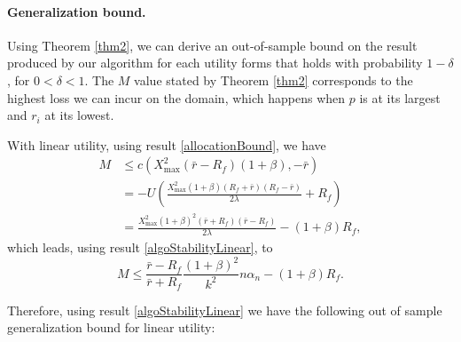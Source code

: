 \paragraph{Generalization bound.}
Using Theorem \ref{thm2}, we can derive an out-of-sample bound on the result produced by
our algorithm for each utility forms that holds with probability $1-\delta$, for
$0<\delta<1$. The $M$ value stated by Theorem \ref{thm2} corresponds to the highest loss
we can incur on the domain, which happens when $p$ is at its largest and $r_i$ at its
lowest.

With linear utility, using result \eqref{allocationBound}, we have
\begin{align*}
  M &\leq c(X^2_{\max}(\bar r - R_f)(1+\beta), -\bar r)\\
    &=-U\left(\frac{X^2_{\max}(1+\beta)(R_f+\bar r)(R_f-\bar r)}{2\lambda} + R_f\right)\\
    &=\frac{X^2_{\max}(1+\beta)^2(\bar r + R_f)(\bar r - R_f)}{2\lambda} - (1+\beta)R_f,
\end{align*}
which leads, using result \eqref{algoStabilityLinear}, to
\begin{equation*}
  M \leq \frac{\bar r - R_f}{\bar r + R_f}\frac{(1+\beta)^2}{k^2}n\alpha_n - (1+\beta)R_f.
\end{equation*}

Therefore, using result \eqref{algoStabilityLinear} we have the following out of sample
generalization bound for linear utility:


